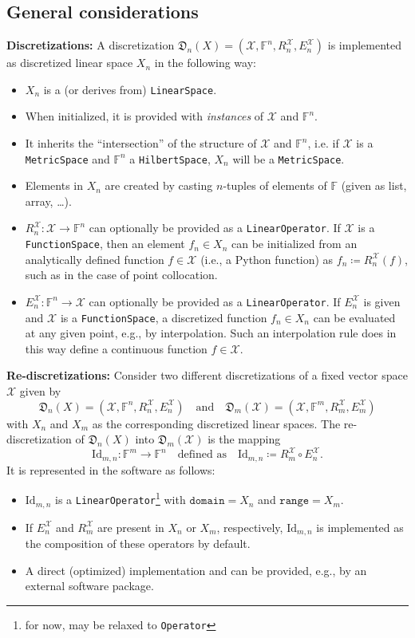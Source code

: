 \documentclass[a4paper]{paper}
\newcommand*{\SPC}[1]{{\ensuremath{\mathscr{#1}}}}
\newcommand*{\SPCX}{\SPC{X}}
\newcommand{\FIELD}{{\ensuremath{\mathbb{F}}}}
\newcommand*{\Fn}{{\ensuremath{\FIELD^n}}}
\newcommand*{\Fm}{{\ensuremath{\FIELD^m}}}
\newcommand{\DISCOP}[1]{{\ensuremath{\mathsf{#1}}}}
\newcommand*{\DISCOPID}{\DISCOP{\mathrm{Id}}}
\newcommand*{\EXT}[2]{\ensuremath{E_{#1}^{#2}}}
\newcommand*{\REST}[2]{\ensuremath{R_{#1}^{#2}}}
\newcommand*{\RnX}{{\ensuremath{\REST{n}{\SPC{X}}}}}
\newcommand*{\RmX}{{\ensuremath{\REST{m}{\SPC{X}}}}}
\newcommand*{\EnX}{{\ensuremath{\EXT{n}{\SPC{X}}}}}
\newcommand*{\EmX}{{\ensuremath{\EXT{m}{\SPC{X}}}}}
\newcommand*{\DISCR}[2]{{\ensuremath{\mathfrak{D}_{#2}(#1)}}}
\newcommand*{\DISCRnX}{\DISCR{X}{n}}
\begin{document}
\subsection{General considerations}
\label{subsec:soft:general}
%
\textbf{Discretizations:}
A discretization $\DISCRnX = (\SPCX, \Fn, \RnX, \EnX)$ is implemented as discretized linear 
space $X_n$ in the following way:
%
\begin{itemize}
 \item $X_n$ is a (or derives from) \texttt{LinearSpace}.
 \item When initialized, it is provided with \emph{instances} of $\SPCX$ and $\Fn$.
 \item It inherits the ``intersection'' of the structure of $\SPCX$ and $\Fn$, i.e. if $\SPCX$ is a 
 \texttt{MetricSpace} and $\Fn$ a \texttt{HilbertSpace}, $X_n$ will be a \texttt{MetricSpace}.
 \item Elements in $X_n$ are created by casting $n$-tuples of elements of $\FIELD$ (given as list, array, \ldots).
 \item $\RnX \colon \SPCX \to \Fn$ 
   can optionally be provided as a \texttt{LinearOperator}. If $\SPCX$ is a \texttt{FunctionSpace},
   then an element $f_n \in X_n$ can be initialized from an analytically defined function $f \in \SPCX$ 
   (i.e., a Python function) as $f_n \coloneqq  \RnX(f)$, such as in the case of point collocation.
 \item $\EnX \colon \Fn \to \SPCX$ can optionally be provided as a \texttt{LinearOperator}. 
   If $\EnX$ is given and $\SPCX$ is a \texttt{FunctionSpace}, 
   a discretized function $f_n \in X_n$ can be evaluated at any given point, e.g., by interpolation. 
   Such an interpolation rule does in this way define a continuous function $f \in \SPCX$.
\end{itemize}
%
\textbf{Re-discretizations:}
Consider two different discretizations of a fixed vector space $\SPCX$ given by 
\[ \DISCRnX = (\SPCX, \Fn, \RnX, \EnX)
   \quad\text{and}\quad
  \DISCR{\SPCX}{m} =(\SPCX, \Fm, \RmX, \EmX)
\]  
with $X_n$ and $X_m$ as the corresponding discretized linear spaces.
The re-discreti\-zation of $\DISCRnX$ into $\DISCR{\SPCX}{m}$ is the mapping 
\[  \DISCOPID_{m,n} \colon \Fm \to \Fn
    \quad\text{defined as}\quad
    \DISCOPID_{m,n} \coloneqq  \RmX \circ \EnX.
\]   
It is represented in the software as follows:
\begin{itemize}
 \item $\DISCOPID_{m,n}$ is a \texttt{LinearOperator}\footnote{for now, may be relaxed to \texttt{Operator}} with 
 $\mathtt{domain} = X_n$ and $\mathtt{range} = X_m$.
 \item If $\EnX$ and $\RmX$ are present in $X_n$ or $X_m$, respectively, $\DISCOPID_{m,n}$ is implemented as the 
 composition of these operators by default.
 \item A direct (optimized) implementation and can be provided, e.g., by an external software package.
\end{itemize}
\end{document}
